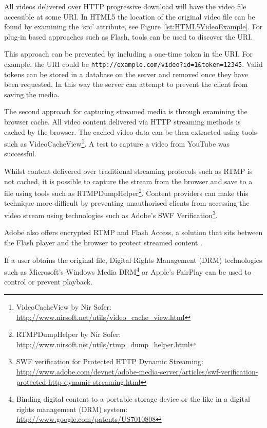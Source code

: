 \documentclass[journal]{IEEEtran}
\begin{document}
All videos delivered over HTTP progressive download will have the video file accessible at some URI. In HTML5 the location of the original video file can be found by examining the `src' attribute, see Figure \ref{lst:HTML5VideoExample}. For plug-in based approaches such as Flash, tools can be used to discover the URI.

This approach can be prevented by including a one-time token in the URI. For example, the URI could be \texttt{http://example.com/video?id=1\&token=12345}. Valid tokens can be stored in a database on the server and removed once they have been requested. In this way the server can attempt to prevent the client from saving the media.

The second approach for capturing streamed media is through examining the browser cache. All video content delivered via HTTP streaming methods is cached by the browser. The cached video data can be then extracted using tools such as VideoCacheView\footnote{VideoCacheView by Nir Sofer: \url{http://www.nirsoft.net/utils/video_cache_view.html}}. A test to capture a video from YouTube was successful.

Whilst content delivered over traditional streaming protocols such as RTMP is not cached, it is possible to capture the stream from the browser and save to a file using tools such as RTMPDumpHelper\footnote{RTMPDumpHelper by Nir Sofer: \url{http://www.nirsoft.net/utils/rtmp_dump_helper.html}}. Content providers can make this technique more difficult by preventing unauthorised clients from accessing the video stream using technologies such as Adobe's SWF Verification\footnote{SWF verification for Protected HTTP Dynamic Streaming: \url{http://www.adobe.com/devnet/adobe-media-server/articles/swf-verification-protected-http-dynamic-streaming.html}}. 

Adobe also offers encrypted RTMP and Flash Access, a solution that sits between the Flash player and the browser to protect streamed content \cite{whitePaper:flashAccess}.

If a user obtains the original file, Digital Rights Management (DRM) technologies such as Microsoft's Windows Media DRM\footnote{Binding digital content to a portable storage device or the like in a digital rights management (DRM) system: \url{http://www.google.com/patents/US7010808}} or Apple's FairPlay can be used to control or prevent playback.
\end{document}
